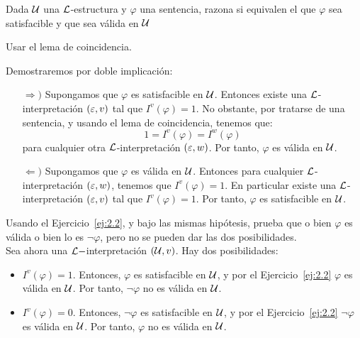 \begin{ejercicio}\label{ej:2.2}
    Dada $\mathcal{U}$ una $\mathcal{L}$-estructura y $\varphi$ una sentencia, razona si equivalen el que $\varphi$ sea satisfacible y que sea válida en $\mathcal{U}$
    \begin{observacion}
        Usar el lema de coincidencia.
    \end{observacion}

    Demostraremos por doble implicación:
    \begin{itemize}
        \item[$\Longrightarrow)$] Supongamos que $\varphi$ es satisfacible en $\mathcal{U}$. Entonces existe una $\mathcal{L}$-interpretación $(\varepsilon,v)$ tal que $I^v(\varphi) = 1$. No obstante, por tratarse de una sentencia, y usando el lema de coincidencia, tenemos que:
        \begin{equation*}
            1 = I^v(\varphi) = I^{w}(\varphi)
        \end{equation*}
        para cualquier otra $\mathcal{L}$-interpretación $(\varepsilon,w)$. Por tanto, $\varphi$ es válida en $\mathcal{U}$.

        \item[$\Longleftarrow)$] Supongamos que $\varphi$ es válida en $\mathcal{U}$. Entonces para cualquier $\mathcal{L}$-interpretación $(\varepsilon,w)$, tenemos que $I^v(\varphi) = 1$. En particular existe una $\mathcal{L}$-interpretación $(\varepsilon,v)$ tal que $I^v(\varphi) = 1$. Por tanto, $\varphi$ es satisfacible en $\mathcal{U}$.
    \end{itemize}
\end{ejercicio}

\begin{ejercicio}\label{ej:2.3}
    Usando el Ejercicio~\ref{ej:2.2}, y bajo las mismas hipótesis, prueba que o bien $\varphi$ es válida o bien lo es $\neg \varphi$, pero no se pueden dar las dos posibilidades.\\

    Sea ahora una $\mathcal{L}-$interpretación $(\mathcal{U},v)$. Hay dos posibilidades:
    \begin{itemize}
        \item \ul{$I^v(\varphi) = 1$}. Entonces, $\varphi$ es satisfacible en $\mathcal{U}$, y por el Ejercicio~\ref{ej:2.2} $\varphi$ es válida en $\mathcal{U}$. Por tanto, $\neg \varphi$ no es válida en $\mathcal{U}$.
        
        \item \ul{$I^v(\varphi) = 0$}. Entonces, $\neg \varphi$ es satisfacible en $\mathcal{U}$, y por el Ejercicio~\ref{ej:2.2} $\neg \varphi$ es válida en $\mathcal{U}$. Por tanto, $\varphi$ no es válida en $\mathcal{U}$.
    \end{itemize}
\end{ejercicio}

